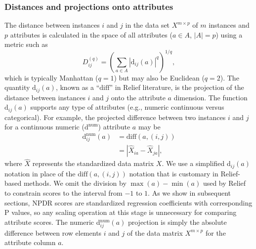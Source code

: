 \documentclass[10pt]{article}
\begin{document}
\subsubsection{Distances and projections onto attributes}
The distance between instances $i$ and $j$ in the data set $X^{m \times p}$ of $m$ instances and $p$ attributes is calculated in the space of all attributes ($a \in A$, $|A|=p$) using a metric such as
\begin{equation}\label{eq:D}
D^{(q)}_{ij}=\left(\sum_{a\in A}|\text{d}_{ij}(a)|^q\right)^{1/q},
\end{equation}
which is typically Manhattan ($q=1$) but may also be Euclidean ($q=2$). The quantity 
$\text{d}_{ij}(a)$,
known as a ``$\text{diff}$'' in Relief literature, is the projection of the distance between instances $i$ and $j$ onto the attribute $a$ dimension. The 
function $\text{d}_{ij}(a)$ supports any type of attributes
(e.g., numeric continuous versus categorical).
For example, the projected difference between two instances $i$ and $j$ for a continuous numeric ($\text{d}^{\text{num}}$) attribute $a$ may be
\begin{equation}\label{eq:diff}
\begin{aligned}
\text{d}^{\text{num}}_{ij}(a)&=\text{diff}(a,(i,j))\\
                                            & = {|\hat{X}_{ia}-\hat{X}_{ja}|},
\end{aligned}
\end{equation}
where $\hat{X}$ represents the standardized data matrix $X$.
We use a simplified d$_{ij}(a)$ notation in place of the $\text{diff}(a,(i,j))$ notation that is customary in Relief-based methods.
We omit the division by $\max(a)-\min(a)$ used by Relief to constrain scores to the interval from $-1$ to $1$.
As we show in subsequent sections, NPDR scores are standardized regression coefficients with corresponding P values, so any scaling operation at this stage is unnecessary for comparing attribute scores. 
The numeric d$^{\text{num}}_{ij}(a)$ projection is simply the absolute difference between row elements $i$ and $j$ of the data matrix $X^{m \times p}$ for the attribute column $a$. 
\end{document}
